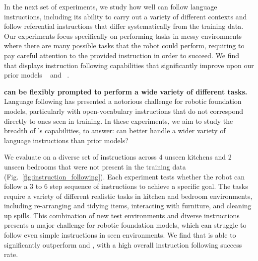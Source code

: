 
\label{sec:instruction_following}

In the next set of experiments, we study how well \MethodName{} can follow language instructions, including its ability to carry out a variety of different contexts and follow referential instructions that differ systematically from the training data. Our experiments focus specifically on performing tasks in messy environments where there are many possible tasks that the robot could perform, requiring \MethodName{} to pay careful attention to the provided instruction in order to succeed. We find that \MethodName{} displays instruction following capabilities that significantly improve upon our prior models \Pizf{}~\cite{black2025pi05} and \Pizs~\cite{pi06model}.

\noindent \textbf{\MethodName{} can be flexibly prompted to perform a wide variety of different tasks.} Language following has presented a notorious challenge for robotic foundation models, particularly with open-vocabulary instructions that do not correspond directly to ones seen in training. In these experiments, we aim to study the breadth of \MethodName{}'s capabilities, to answer: can \MethodName{} better handle a wider variety of language instructions than prior models?

We evaluate \MethodName{} on a diverse set of instructions across 4 unseen kitchens and 2 unseen bedrooms that were not present in the training data (Fig.~\ref{fig:instruction_following}). Each experiment tests whether the robot can follow a 3 to 6 step sequence of instructions to achieve a specific goal. The tasks require a variety of different realistic tasks in kitchen and bedroom environments, including re-arranging and tidying items, interacting with furniture, and cleaning up spills. This combination of new test environments and diverse instructions presents a major challenge for robotic foundation models, which can struggle to follow even simple instructions in seen environments. We find that \MethodName{} is able to significantly outperform \Pizf{} and \Pizs{}, with a high overall instruction following success rate.

